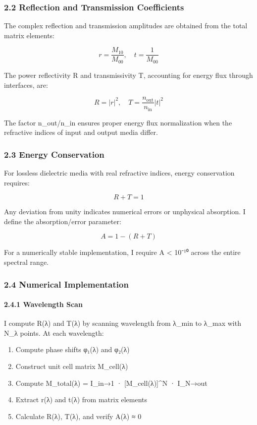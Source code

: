\documentclass[
]{article}
\providecommand{\tightlist}{%
  \setlength{\itemsep}{0pt}\setlength{\parskip}{0pt}}
\begin{document}
\subsubsection{2.2 Reflection and Transmission
Coefficients}\label{reflection-and-transmission-coefficients}

The complex reflection and transmission amplitudes are obtained from the
total matrix elements:

\[r = \frac{M_{10}}{M_{00}}, \quad t = \frac{1}{M_{00}}\]

The power reflectivity R and transmissivity T, accounting for energy
flux through interfaces, are:

\[R = |r|^2, \quad T = \frac{n_{\text{out}}}{n_{\text{in}}}|t|^2\]

The factor n\_out/n\_in ensures proper energy flux normalization when
the refractive indices of input and output media differ.

\subsubsection{2.3 Energy Conservation}\label{energy-conservation}

For lossless dielectric media with real refractive indices, energy
conservation requires:

\[R + T = 1\]

Any deviation from unity indicates numerical errors or unphysical
absorption. I define the absorption/error parameter:

\[A = 1 - (R + T)\]

For a numerically stable implementation, I require \textbar A\textbar{}
\textless{} 10⁻¹⁰ across the entire spectral range.

\subsubsection{2.4 Numerical
Implementation}\label{numerical-implementation}

\paragraph{2.4.1 Wavelength Scan}\label{wavelength-scan}

I compute R(λ) and T(λ) by scanning wavelength from λ\_min to λ\_max
with N\_λ points. At each wavelength:

\begin{enumerate}
\def\labelenumi{\arabic{enumi}.}
\tightlist
\item
  Compute phase shifts φ₁(λ) and φ₂(λ)
\item
  Construct unit cell matrix M\_cell(λ)
\item
  Compute M\_total(λ) = I\_in→1 · {[}M\_cell(λ){]}\^{}N · I\_N→out
\item
  Extract r(λ) and t(λ) from matrix elements
\item
  Calculate R(λ), T(λ), and verify A(λ) ≈ 0
\end{enumerate}
\end{document}
